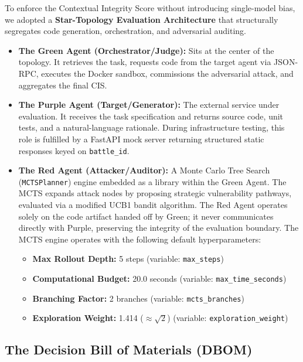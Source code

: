 \documentclass[11pt, a4paper]{article}
\begin{document}
To enforce the Contextual Integrity Score without introducing single-model bias, we adopted a \textbf{Star-Topology Evaluation Architecture} that structurally segregates code generation, orchestration, and adversarial auditing.

\begin{itemize}[leftmargin=*]
  \item \textbf{The Green Agent (Orchestrator/Judge):} Sits at the center of the topology. It retrieves the task, requests code from the target agent via JSON-RPC, executes the Docker sandbox, commissions the adversarial attack, and aggregates the final CIS.
  \item \textbf{The Purple Agent (Target/Generator):} The external service under evaluation. It receives the task specification and returns source code, unit tests, and a natural-language rationale. During infrastructure testing, this role is fulfilled by a FastAPI mock server returning structured static responses keyed on \texttt{battle\_id}.
\item \textbf{The Red Agent (Attacker/Auditor):} A Monte Carlo Tree Search (\texttt{MCTSPlanner}) engine embedded as a library within the Green Agent. The MCTS expands attack nodes by proposing strategic vulnerability pathways, evaluated via a modified UCB1 bandit algorithm. The Red Agent operates solely on the code artifact handed off by Green; it never communicates directly with Purple, preserving the integrity of the evaluation boundary. The MCTS engine operates with the following default hyperparameters:

    \begin{itemize}
        \item \textbf{Max Rollout Depth:} 5 steps (variable: \texttt{max\_steps})
        \item \textbf{Computational Budget:} 20.0 seconds (variable: \texttt{max\_time\_seconds})
        \item \textbf{Branching Factor:} 2 branches (variable: \texttt{mcts\_branches})
        \item \textbf{Exploration Weight:} 1.414 ($\approx \sqrt{2}$) (variable: \texttt{exploration\_weight})
    \end{itemize}
\end{itemize}

\subsection{The Decision Bill of Materials (DBOM)}
\end{document}
